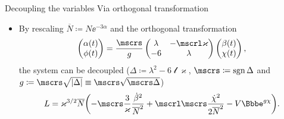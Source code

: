 \documentclass[8pt]{beamer}
\begin{document}
\begin{frame}%
{Decoupling the variables}%
{Via orthogonal transformation}
\begin{itemize}
\item By rescaling $\overline{N} \coloneqq N\ee^{-3\alpha}$ and
%
the orthogonal transformation
\begin{align}
\begin{pmatrix}
\rfun{\alpha}{t} \\ \rfun{\phi}{t}
\end{pmatrix} = \frac{\mscrs}{g}
\begin{pmatrix}
\lambda & -\mscrl\varkappa \\
-6 & \lambda
\end{pmatrix}
\begin{pmatrix}
\rfun{\beta}{t} \\ \rfun{\chi}{t}
\end{pmatrix},
\end{align}
the system can be decoupled
($\Delta \coloneqq \lambda^2 - 6\mscrl\varkappa$,
\textcolor{blue}{$\mscrs \coloneqq \sgn \Delta$} and
$g \coloneqq \mscrs \sqrt{\vbr{\Delta}} \equiv \mscrs\sqrt{\mscrs\Delta}$)
\begin{align}
L = \varkappa^{3/2}\overline{N}
\rbr{-\mscrs\frac{3}{\varkappa}\frac{\dot{\beta}^2}{\overline{N}^2}
+\mscrl\mscrs\frac{\dot{\chi}^2}{2\overline{N}^2}
-V\ee^{g \chi}}.
\label{eq:lagrangian-decoupled}
\end{align}



\end{itemize}
\end{frame}
\end{document}

